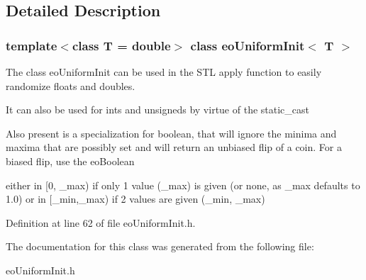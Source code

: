 \subsection{Detailed Description}
\subsubsection*{template$<$class T = double$>$ class eo\-Uniform\-Init$<$ T $>$}

The class eo\-Uniform\-Init can be used in the STL apply function to easily randomize floats and doubles. 

It can also be used for ints and unsigneds by virtue of the static\_\-cast

Also present is a specialization for boolean, that will ignore the minima and maxima that are possibly set and will return an unbiased flip of a coin. For a biased flip, use the eo\-Boolean

either in [0, \_\-max) if only 1 value (\_\-max) is given (or none, as \_\-max defaults to 1.0) or in [\_\-min,\_\-max) if 2 values are given (\_\-min, \_\-max) 



Definition at line 62 of file eo\-Uniform\-Init.h.

The documentation for this class was generated from the following file:\begin{CompactItemize}
\item 
eo\-Uniform\-Init.h\end{CompactItemize}
